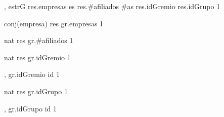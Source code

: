 {, }{estrG}
{
	\state res.empresas \asig es 							
	\state res.\#afiliados \asig \#as 						
	\state res.idGremio  							
	\state res.idGrupo  								
}
{1}
{}

{}{conj(empresa)}
{
	\state res \asig gr.empresas 							
}
{1}
{}

{}{nat}
{
	\state res \asig gr.\#afiliados 						
}
{1}
{}

{}{nat}
{
	\state res \asig gr.idGremio 									
}
{1}
{}

{, }{}
{
	\state gr.idGremio \asig id 									
}
{1}
{}

{}{nat}
{
	\state res \asig gr.idGrupo 									
}
{1}
{}

{, }{}
{
	\state gr.idGrupo \asig id 									
}
{1}
{}